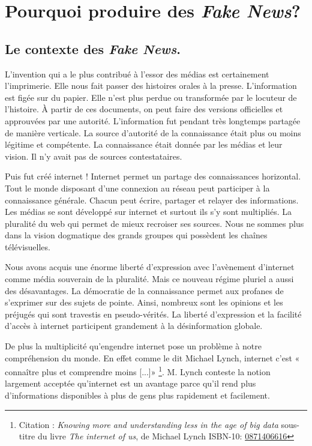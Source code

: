 \documentclass[11pt,a4paper,oldfontcommands]{memoir}
\begin{document}
\section{Pourquoi produire des \textit{Fake News}?}

\subsection{Le contexte des \textit{Fake News}.}
L'invention qui a le plus contribué à l'essor des médias est certainement l'imprimerie.
Elle nous fait passer des histoires orales à la presse.
L'information est figée sur du papier.
Elle n'est plus perdue ou transformée par le locuteur de l'histoire.
À partir de ces documents, on peut faire des versions officielles et approuvées par une autorité.
L'information fut pendant très longtemps partagée de manière verticale.
La source d'autorité de la connaissance était plus ou moins légitime et compétente.
La connaissance était donnée par les médias et leur vision. Il n'y avait pas de sources contestataires.

Puis fut créé internet ! Internet permet un partage des connaissances horizontal.
Tout le monde disposant d'une connexion au réseau peut participer à la connaissance générale.
Chacun peut écrire, partager et relayer des informations.
Les médias se sont développé sur internet et surtout ils s'y sont multipliés.
La pluralité du web qui permet de mieux recroiser ses sources.
Nous ne sommes plus dans la vision dogmatique des grands groupes qui possèdent les chaînes télévisuelles.

Nous avons acquis une énorme liberté d'expression avec l'avènement d'internet comme média souverain de la pluralité.
Mais ce nouveau régime pluriel a aussi des désavantages.
La démocratie de la connaissance permet aux profanes de s'exprimer sur des sujets de pointe.
Ainsi, nombreux sont les opinions et les préjugés qui sont travestis en pseudo-vérités.
La liberté d'expression et la facilité d'accès à internet participent grandement à la désinformation globale.

De plus la multiplicité qu'engendre internet pose un problème à notre compréhension du monde.
En effet comme le dit Michael Lynch, internet c'est « connaître plus et comprendre moins [...]»
\footnote{Citation : \textit{Knowing more and understanding less in the age of big data} sous-titre du livre \textit{The internet of us}, de Michael Lynch ISBN-10: \href{https://www.kirkusreviews.com/book-reviews/michael-patrick-lynch/the-internet-of-us/}{0871406616}}.
M. Lynch conteste la notion largement acceptée qu'internet est un avantage parce qu'il rend plus d'informations disponibles à plus de gens plus rapidement et facilement.
\end{document}
